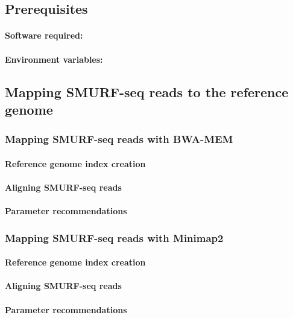 \documentclass[11pt]{article}
\begin{document}
\subsection{Prerequisites}
\paragraph{Software required:}


\paragraph{Environment variables:}



\subsection{Mapping SMURF-seq reads to the reference genome}

\subsubsection{Mapping SMURF-seq reads with BWA-MEM}
\paragraph{Reference genome index creation}

\paragraph{Aligning SMURF-seq reads}

\paragraph{Parameter recommendations}


\subsubsection{Mapping SMURF-seq reads with Minimap2}
\paragraph{Reference genome index creation}

\paragraph{Aligning SMURF-seq reads}

\paragraph{Parameter recommendations}
\end{document}
